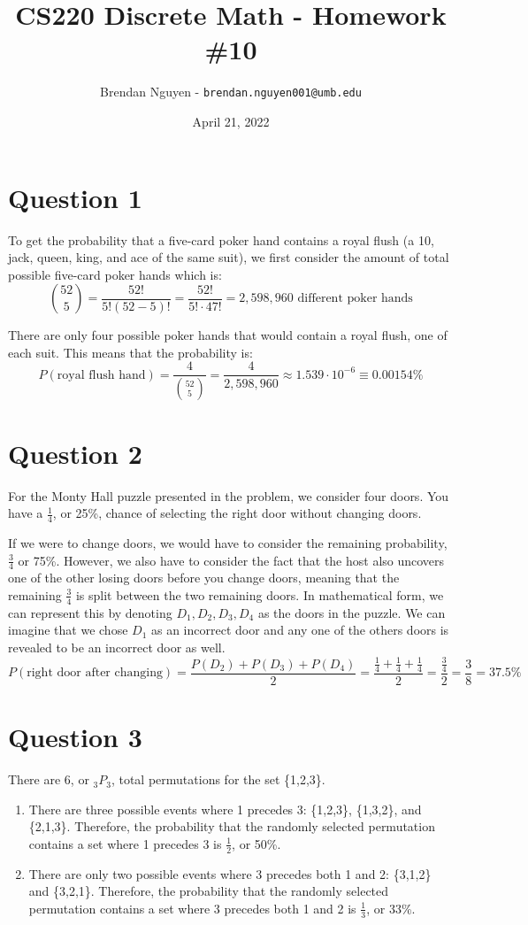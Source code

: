 \documentclass[11pt]{article}
\title{CS220 Discrete Math - Homework \#10}
\author{Brendan Nguyen - \texttt{brendan.nguyen001@umb.edu}}
\date{April 21, 2022}
\begin{document}
\maketitle

\section*{Question 1}
To get the probability that a five-card poker hand contains a royal flush (a 10, jack, queen, king, and ace of the same suit), we first consider the amount of total possible five-card poker hands which is:
\[\binom{52}{5} = \frac{52!}{5!(52-5)!} = \frac{52!}{5! \cdot 47!} = 2,598,960 \text{ different poker hands}\]

There are only four possible poker hands that would contain a royal flush, one of each suit. This means that the probability is:
\[P(\text{royal flush hand}) = \frac{4}{\binom{52}{5}} = \frac{4}{2,598,960} \approx 1.539 \cdot 10^{-6} \equiv 0.00154\%\]

\section*{Question 2}
For the Monty Hall puzzle presented in the problem, we consider four doors. You have a $\frac{1}{4}$, or 25\%, chance of selecting the right door without changing doors. 

If we were to change doors, we would have to consider the remaining probability, $\frac{3}{4}$ or 75\%. However, we also have to consider the fact that the host also uncovers one of the other losing doors before you change doors, meaning that the remaining $\frac{3}{4}$ is split between the two remaining doors. In mathematical form, we can represent this by denoting $D_1, D_2, D_3, D_4$ as the doors in the puzzle. We can imagine that we chose $D_1$ as an incorrect door and any one of the others doors is revealed to be an incorrect door as well.
\[P(\text{right door after changing}) = \frac{P(D_2) + P(D_3) + P(D_4)}{2} = \frac{\frac{1}{4} + \frac{1}{4} + \frac{1}{4}}{2} = \frac{\frac{3}{4}}{2} = \frac{3}{8} = 37.5\%\]

\section*{Question 3}
There are 6, or $_{3}P_{3}$, total permutations for the set \{1,2,3\}.

\renewcommand{\labelenumi}{(\alph{enumi})}

\begin{enumerate}
    \item There are three possible events where 1 precedes 3: \{1,2,3\}, \{1,3,2\}, and \{2,1,3\}. Therefore, the probability that the randomly selected permutation contains a set where 1 precedes 3 is $\frac{1}{2}$, or 50\%.
    \item There are only two possible events where 3 precedes both 1 and 2: \{3,1,2\} and \{3,2,1\}. Therefore, the probability that the randomly selected permutation contains a set where 3 precedes both 1 and 2 is $\frac{1}{3}$, or 33\%.
\end{enumerate}
\end{document}
